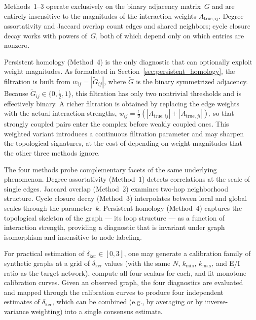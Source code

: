\documentclass[11pt]{article}
\begin{document}
Methods~1--3 operate exclusively on the binary adjacency matrix~$G$
and are entirely insensitive to the magnitudes of the interaction
weights $A_{\mathrm{true},ij}$.  Degree assortativity and Jaccard
overlap count edges and shared neighbors; cycle closure
decay works with powers of~$G$, both of
which depend only on which entries are nonzero.

Persistent homology (Method~4) is the only diagnostic that can
optionally exploit weight magnitudes.  As formulated in
Section~\ref{sec:persistent_homology}, the filtration is built from
$w_{ij}=|\tilde{G}_{ij}|$, where $\tilde{G}$ is the binary
symmetrized adjacency.  Because $\tilde{G}_{ij}\in\{0,\tfrac{1}{2},1\}$,
this filtration has only two nontrivial thresholds and is
effectively binary.  A richer filtration is obtained by replacing the
edge weights with the actual interaction strengths,
$w_{ij}=\tfrac{1}{2}(|A_{\mathrm{true},ij}|+|A_{\mathrm{true},ji}|)$,
so that strongly coupled pairs enter the complex before weakly coupled
ones.  This weighted variant introduces a continuous filtration
parameter and may sharpen the topological signatures, at the cost of
depending on weight magnitudes that the other three methods ignore.

The four methods probe complementary facets of the same underlying
phenomenon.  Degree assortativity (Method~1) detects correlations at
the scale of single edges.  Jaccard overlap (Method~2) examines
two-hop neighborhood structure.  Cycle closure decay (Method~3)
interpolates between local and global scales through the
parameter~$k$.  Persistent homology (Method~4) captures the
topological skeleton of the graph --- its 
loop structure --- as a function of interaction strength, providing a
diagnostic that is invariant under graph isomorphism and insensitive
to node labeling.

For practical estimation of $\delta_{\mathrm{ker}}\in[0,3]$, one may
generate a calibration family of synthetic graphs at a grid of
$\delta_{\mathrm{ker}}$ values (with the same $N$, $k_{\min}$,
$k_{\max}$, and E/I ratio as the target network), compute all four
scalars for each, and fit monotone calibration curves.  Given an
observed graph, the four diagnostics are evaluated and mapped through
the calibration curves to produce four independent estimates of
$\delta_{\mathrm{ker}}$, which can be combined (e.g., by averaging or
by inverse-variance weighting) into a single consensus estimate.
\end{document}
